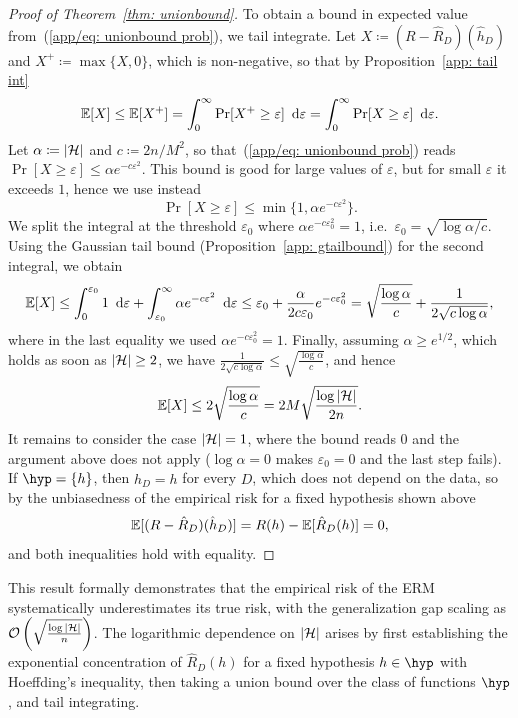 \documentclass[reqno]{amsart}
\begin{document}
\begin{theorem}
\begin{proof}[Proof of Theorem~\ref{thm: unionbound}]
To obtain a bound in expected value from~(\ref{app/eq: unionbound prob}), we tail integrate. Let $X\coloneq(R-\hat R_D)(\hat h_D)$ and $X^+\coloneq\max\{X,0\}$, which is non-negative, so that by Proposition~\ref{app: tail int}
\[
\mathbb{E}[X] \le \mathbb{E}[X^+] = \int_0^\infty \Pr[X^+\ge\varepsilon]\mathop{}\!\,\,\mathrm{d}\varepsilon = \int_0^\infty \Pr[X\ge\varepsilon]\mathop{}\!\,\,\mathrm{d}\varepsilon.
\]
Let $\alpha\coloneq\vert\mathcal{H}\vert$ and $c\coloneq 2n/M^2$, so that~(\ref{app/eq: unionbound prob}) reads $\Pr[X\ge\varepsilon]\le\alpha e^{-c\varepsilon^2}$. This bound is good for large values of $\varepsilon$, but for small $\varepsilon$ it exceeds $1$, hence we use instead
\[
\Pr[X\ge\varepsilon] \le \min\{1,\alpha e^{-c\varepsilon^2}\}.
\]
We split the integral at the threshold $\varepsilon_0$ where $\alpha e^{-c\varepsilon_0^2} = 1$, i.e.\ $\varepsilon_0 = \sqrt{\log\alpha/c}$. Using the Gaussian tail bound (Proposition~\ref{app: gtailbound}) for the second integral, we obtain
\[
\mathbb{E}[X] \le \int_0^{\varepsilon_0} 1\mathop{}\!\,\,\mathrm{d}\varepsilon + \int_{\varepsilon_0}^\infty \alpha e^{-c\varepsilon^2}\mathop{}\!\,\,\mathrm{d}\varepsilon
\le \varepsilon_0 + \frac{\alpha}{2c\varepsilon_0}e^{-c\varepsilon_0^2}
= \sqrt{\frac{\log\alpha}{c}} + \frac{1}{2\sqrt{c\log\alpha}},
\]
where in the last equality we used $\alpha e^{-c\varepsilon_0^2}=1$. Finally, assuming $\alpha\ge e^{1/2}$, which holds as soon as $\vert\mathcal{H}\vert\ge 2$, we have $\frac{1}{2\sqrt{c\log\alpha}}\le\sqrt{\frac{\log\alpha}{c}}$, and hence
\[
\mathbb{E}[X] \le 2\sqrt{\frac{\log\alpha}{c}} = 2M\sqrt{\frac{\log\vert\mathcal{H}\vert}{2n}}.
\]
It remains to consider the case $\vert\mathcal{H}\vert=1$, where the bound reads $0$ and the argument above does not apply ($\log\alpha=0$ makes $\varepsilon_0=0$ and the last step fails). If $\hyp=\{h\}$, then $\hat h_D=h$ for every $D$, which does not depend on the data, so by the unbiasedness of the empirical risk for a fixed hypothesis shown above
\[
\mathbb{E}[(R-\hat R_D)(\hat h_D)] = R(h) - \mathbb{E}[\hat R_D(h)] = 0,
\]
and both inequalities hold with equality.
\end{proof}
\end{theorem}

This result formally demonstrates that the empirical risk of the ERM systematically underestimates its true risk, with the generalization gap scaling as $\mathcal{O}\left(\sqrt{\frac{\log \vert\mathcal{H}\vert}{n}}\right)$.
The logarithmic dependence on $\vert\mathcal{H}\vert$ arises by first establishing the exponential concentration of $\hat{R}_D(h)$ for a fixed hypothesis $h \in \hyp$ with Hoeffding's inequality, then taking a union bound over the class of functions $\hyp$, and tail integrating. 
\end{document}
